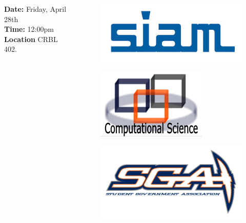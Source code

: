 \documentclass[10pt]{beamer}
\begin{document}
\begin{frame}
\begin{columns}[t]
\begin{column}{.5\textwidth}
		\small \textbf{Date:} Friday, April 28th\\
		\vspace*{0.1cm}
		\textbf{Time:} 12:00pm \\
		\vspace*{0.1cm}
		\textbf{Location} CRBL 402.
	\end{column}
	\begin{column}{.2\textwidth}
		\begin{figure}[t!]
		\includegraphics[width=.8\textwidth, height=.4\textwidth]{siam.jpg}
		\end{figure}
		\begin{figure}[t!]
		\includegraphics[width=.8\textwidth, height=.4\textwidth]{cps.png}
		\end{figure}
		\begin{figure}[t!]
		\includegraphics[width=.8\textwidth, height=.4\textwidth]{sga.png}

\end{figure}
\end{column}
\end{columns}
\end{frame}
\end{document}
